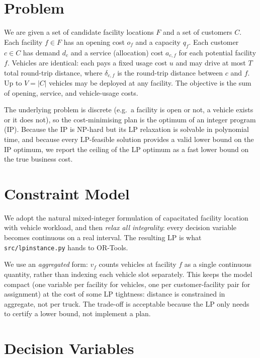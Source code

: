 \documentclass[11pt]{article}
\begin{document}
\section{Problem}
\label{s:problem}

We are given a set of candidate facility locations $F$ and a set of customers
$C$. Each facility $f \in F$ has an opening cost $o_f$ and a capacity $q_f$.
Each customer $c \in C$ has demand $d_c$ and a service (allocation) cost
$a_{c,f}$ for each potential facility $f$. Vehicles are identical: each pays
a fixed usage cost $u$ and may drive at most $T$ total round-trip distance,
where $\delta_{c,f}$ is the round-trip distance between $c$ and $f$. Up to
$V = |C|$ vehicles may be deployed at any facility. The objective is the sum
of opening, service, and vehicle-usage costs.

The underlying problem is discrete (e.g.\ a facility is open or not, a
vehicle exists or it does not), so the cost-minimising plan is the optimum
of an integer program (IP). Because the IP is NP-hard but its LP relaxation
is solvable in polynomial time, and because every LP-feasible solution
provides a valid lower bound on the IP optimum, we report the ceiling of
the LP optimum as a fast lower bound on the true business cost.

\section{Constraint Model}
\label{s:model}

We adopt the natural mixed-integer formulation of capacitated facility
location with vehicle workload, and then \emph{relax all integrality}: every
decision variable becomes continuous on a real interval. The resulting LP
is what \texttt{src/lpinstance.py} hands to OR-Tools.

We use an \emph{aggregated} form: $v_f$ counts vehicles at facility $f$ as
a single continuous quantity, rather than indexing each vehicle slot
separately. This keeps the model compact (one variable per facility for
vehicles, one per customer-facility pair for assignment) at the cost of
some LP tightness: distance is constrained in aggregate, not per truck.
The trade-off is acceptable because the LP only needs to certify a lower
bound, not implement a plan.

\section{Decision Variables}
\label{s:vars}
\end{document}
